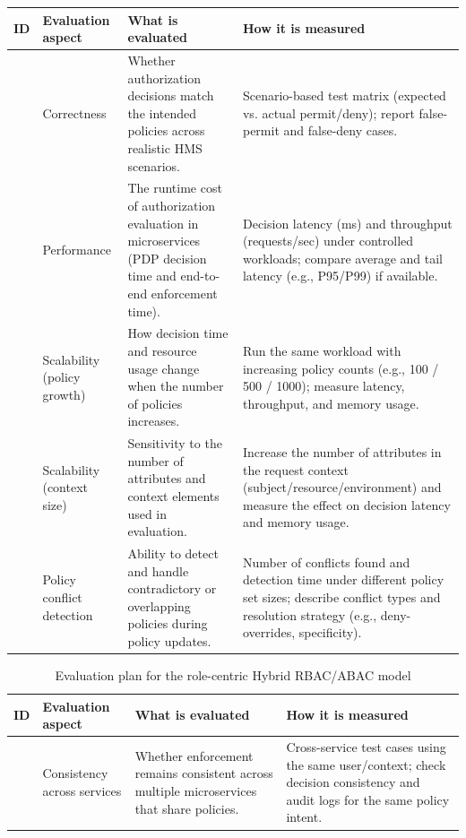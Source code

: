 \begin{table}[H]
\centering
\renewcommand{\arraystretch}{1.2}
\setlength{\tabcolsep}{6pt}
\begin{tabularx}{0.98\textwidth}{|
>{\centering\arraybackslash}p{0.9cm}|
>{\raggedright\arraybackslash}p{3.2cm}|
>{\raggedright\arraybackslash}X|
>{\raggedright\arraybackslash}p{4.2cm}|
}
\hline
\textbf{ID} & \textbf{Evaluation aspect} & \textbf{What is evaluated} & \textbf{How it is measured} \\
\hline
1 & Correctness &
Whether authorization decisions match the intended policies across realistic HMS scenarios. &
Scenario-based test matrix (expected vs. actual permit/deny); report false-permit and false-deny cases. \\
\hline
2 & Performance &
The runtime cost of authorization evaluation in microservices (PDP decision time and end-to-end enforcement time). &
Decision latency (ms) and throughput (requests/sec) under controlled workloads; compare average and tail latency (e.g., P95/P99) if available. \\
\hline
3 & Scalability (policy growth) &
How decision time and resource usage change when the number of policies increases. &
Run the same workload with increasing policy counts (e.g., 100 / 500 / 1000); measure latency, throughput, and memory usage. \\
\hline
4 & Scalability (context size) &
Sensitivity to the number of attributes and context elements used in evaluation. &
Increase the number of attributes in the request context (subject/resource/environment) and measure the effect on decision latency and memory usage. \\
\hline
5 & Policy conflict detection &
Ability to detect and handle contradictory or overlapping policies during policy updates. &
Number of conflicts found and detection time under different policy set sizes; describe conflict types and resolution strategy (e.g., deny-overrides, specificity). \\
\hline

\end{tabularx}
\end{table}

\begin{table}[H]
    \centering
\renewcommand{\arraystretch}{1.2}
\setlength{\tabcolsep}{6pt}
\label{tab:evaluation-plan}
\begin{tabularx}{0.98\textwidth}{|
>{\centering\arraybackslash}p{0.9cm}|
>{\raggedright\arraybackslash}p{3.2cm}|
>{\raggedright\arraybackslash}X|
>{\raggedright\arraybackslash}p{4.2cm}|
}
\hline
\textbf{ID} & \textbf{Evaluation aspect} & \textbf{What is evaluated} & \textbf{How it is measured} \\
\hline
6 & Consistency across services &
Whether enforcement remains consistent across multiple microservices that share policies. &
Cross-service test cases using the same user/context; check decision consistency and audit logs for the same policy intent. \\
\hline
\end{tabularx}
    \caption{Evaluation plan for the role-centric Hybrid RBAC/ABAC model}
\label{tab:evaluation-plan}
\end{table}

